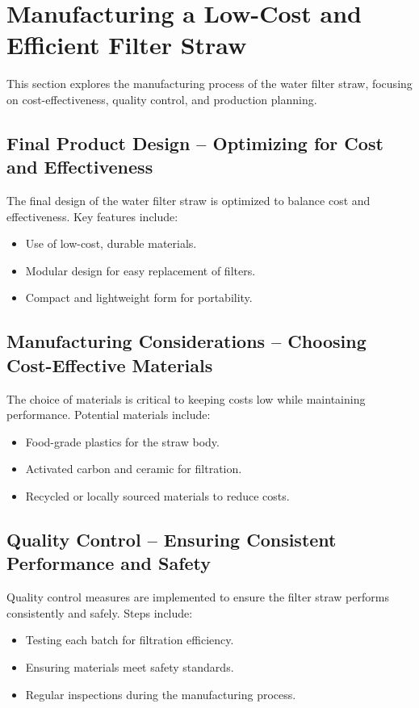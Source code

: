 \documentclass{article}
\begin{document}
\newpage





\section{Manufacturing a Low-Cost and Efficient Filter Straw}
This section explores the manufacturing process of the water filter straw, focusing on cost-effectiveness, quality control, and production planning.

\vspace{0.5cm}

\subsection{Final Product Design – Optimizing for Cost and Effectiveness}
The final design of the water filter straw is optimized to balance cost and effectiveness. Key features include:
\begin{itemize}
    \item Use of low-cost, durable materials.
    \item Modular design for easy replacement of filters.
    \item Compact and lightweight form for portability.
\end{itemize}

\vspace{0.5cm}

\subsection{Manufacturing Considerations – Choosing Cost-Effective Materials}
The choice of materials is critical to keeping costs low while maintaining performance. Potential materials include:
\begin{itemize}
    \item Food-grade plastics for the straw body.
    \item Activated carbon and ceramic for filtration.
    \item Recycled or locally sourced materials to reduce costs.
\end{itemize}

\vspace{0.5cm}

\subsection{Quality Control – Ensuring Consistent Performance and Safety}
Quality control measures are implemented to ensure the filter straw performs consistently and safely. Steps include:
\begin{itemize}
    \item Testing each batch for filtration efficiency.
    \item Ensuring materials meet safety standards.
    \item Regular inspections during the manufacturing process.
\end{itemize}
\end{document}
